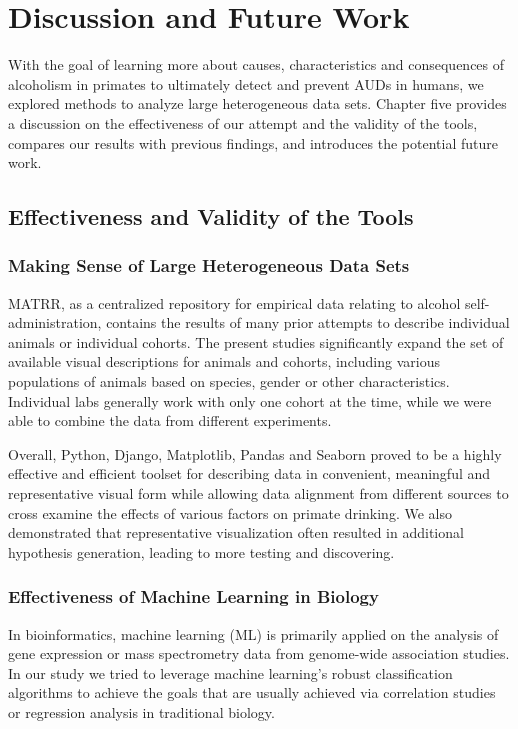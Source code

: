 \chapter{Discussion and Future Work}
With the goal of learning more about causes, characteristics and consequences of alcoholism in primates to ultimately detect and prevent AUDs in humans, we explored methods to analyze large heterogeneous data sets. Chapter five provides a discussion on the effectiveness of our attempt and the validity of the tools, compares our results with previous findings, and introduces the potential future work.


\section{Effectiveness and Validity of the Tools}
\subsection{Making Sense of Large Heterogeneous Data Sets}
MATRR, as a centralized repository for empirical data relating to alcohol self-administration, contains the results of many prior attempts to describe individual animals or individual cohorts. The present studies significantly expand the set of available visual descriptions for animals and cohorts, including various populations of animals based on species, gender or other characteristics. Individual labs generally work with only one cohort at the time, while we were able to combine the data from different experiments. 

Overall, Python, Django, Matplotlib, Pandas and Seaborn proved to be a highly effective and efficient toolset for describing data in convenient, meaningful and representative visual form while allowing data alignment from different sources to cross examine the effects of various factors on primate drinking. We also demonstrated that representative visualization often resulted in additional hypothesis generation, leading to more testing and discovering. 

\subsection{Effectiveness of Machine Learning in Biology}
In bioinformatics, machine learning (ML) is primarily applied on the analysis of gene expression or mass spectrometry data from genome-wide association studies. In our study we tried to leverage machine learning's robust classification algorithms to achieve the goals that are usually achieved via correlation studies or regression analysis in traditional biology. 

